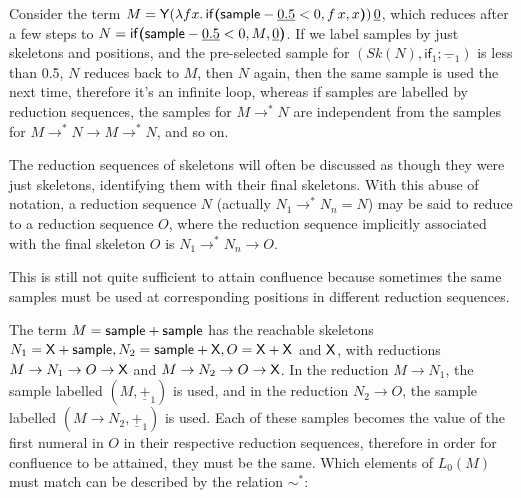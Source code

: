\begin{example} Consider the term $M = \mathsf{Y} (\lambda f x.\, \mathsf{if}\boldsymbol{(}\mathsf{sample} - \underline{0.5} < 0, f \, x, x\boldsymbol{)}) \, \underline 0$, which reduces after a few steps to $N = \mathsf{if}\boldsymbol{(}\mathsf{sample} - \underline{0.5}  < 0, M, \underline 0\boldsymbol{)}$. If we label samples by just skeletons and positions, and the pre-selected sample for $(\mathit{Sk}(N),\textsf{if}_1;\underline{-}_1)$ is less than 0.5, $N$ reduces back to $M$, then $N$ again, then the same sample is used the next time, therefore it's an infinite loop, whereas if samples are labelled by reduction sequences, the samples for $M \to^\ast N$ are independent from the samples for $M \to^\ast N \to M \to^\ast N$, and so on.
\end{example}

The reduction sequences of skeletons will often be discussed as though they were just skeletons, identifying them with their final skeletons. With this abuse of notation, a reduction sequence $N$ (actually $N_1 \to^\ast N_n = N$) may be said to reduce to a reduction sequence $O$, where the reduction sequence implicitly associated with the final skeleton $O$ is $N_1 \to^\ast N_n \to O$.

This is still not quite sufficient to attain confluence because sometimes the same samples must be used at corresponding positions in different reduction sequences. 

\begin{example} \label{ex:cousin sim} 
The term $M = \mathsf{sample} + \mathsf{sample}$ has the reachable skeletons $N_1 = \mathsf{X} + \mathsf{sample}, N_2 = \mathsf{sample} + \mathsf{X}, O = \mathsf{X} + \mathsf{X}$ and $\mathsf{X}$, with reductions $M \to N_1 \to O \to \mathsf{X}$ and $M \to N_2 \to O \to \mathsf{X}$. 
In the reduction $M \to N_1$, the sample labelled $(M, \underline{+}_1)$ is used, and in the reduction $N_2 \to O$, the sample labelled $(M \to N_2, \underline{+}_1)$ is used. 
Each of these samples becomes the value of the first numeral in $O$ in their respective reduction sequences, therefore in order for confluence to be attained, they must be the same. Which elements of $L_0(M)$ must match can be described by the relation $\sim^*$:
\end{example}

